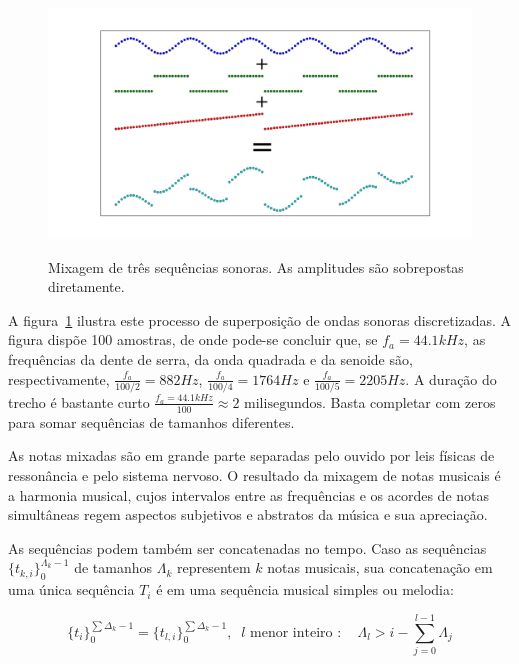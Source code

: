 \begin{figure}[h!]
    {\centering
        \includegraphics[width=\textwidth]{figuras/mixagem}}
    \caption{Mixagem de três sequências sonoras. As amplitudes são sobrepostas diretamente.}

        \label{fig:mixagem}
\end{figure}


A figura~\ref{fig:mixagem} ilustra este processo de superposição de ondas sonoras discretizadas. A figura dispõe 100 amostras, de onde pode-se concluir que, se $f_a=44.1kHz$, as frequências da dente de serra, da onda quadrada e da senoide são,
respectivamente, $\frac{f_a}{100/2}=882Hz$, $\frac{f_a}{100/4}=1764Hz$ e $\frac{f_a}{100/5}=2205Hz$. A duração do trecho é bastante curto $\frac{f_a=44.1kHz}{100} \approx 2 \text{ milisegundos}$. Basta completar com zeros para somar sequências de tamanhos diferentes. 

As notas mixadas são em grande parte separadas pelo ouvido por leis físicas de ressonância e pelo sistema nervoso.\cite{Roederer} O resultado da mixagem de notas musicais é a harmonia musical, cujos intervalos entre as frequências e os acordes de notas simultâneas regem aspectos subjetivos e abstratos da música e sua apreciação.\cite{Harmonia} 

As sequências podem também ser concatenadas no tempo. Caso as sequências $\{t_{k,i}\}_0^{\Lambda_k-1}$ de tamanhos $\Lambda_k$  representem $k$ notas musicais, sua concatenação em uma única sequência $T_i$ é em uma sequência musical simples ou melodia:

\begin{equation}\label{eq:concatenacao}
\{t_i\}_0^{\sum\Delta_k-1}=\{t_{l,i}\}_0^{\sum\Delta_k-1}, \;\; l\text{ menor inteiro } : \quad \Lambda_l > i -\sum_{j=0}^{l-1}\Lambda_j
\end{equation}

